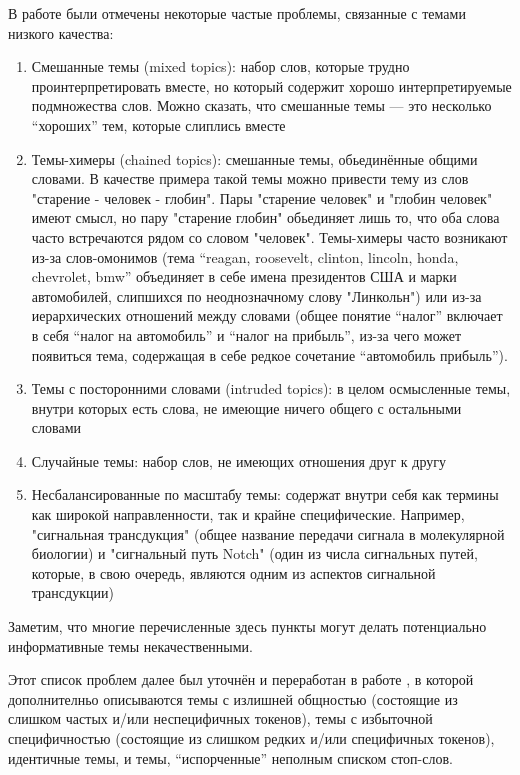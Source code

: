 В работе \cite{mimno} были отмечены некоторые частые проблемы, связанные с темами низкого качества:

\begin{enumerate}
\item{Смешанные темы (mixed topics): набор слов, которые трудно проинтерпретировать вместе, но который содержит хорошо интерпретируемые подмножества слов. Можно сказать, что смешанные темы --- это несколько ``хороших'' тем, которые слиплись вместе}
\item{Темы-химеры (chained topics): смешанные темы, обьединённые общими словами. В качестве примера такой темы можно привести тему из слов "старение - человек - глобин". Пары "старение человек" и "глобин человек" имеют смысл, но пару "старение глобин" обьединяет лишь то, что оба слова часто встречаются рядом со словом "человек". Темы-химеры часто возникают из-за слов-омонимов (тема ``reagan, roosevelt, clinton, lincoln, honda, chevrolet, bmw'' объединяет в себе имена президентов США и марки автомобилей, слипшихся по неоднозначному слову "Линкольн") или из-за иерархических отношений между словами (общее понятие ``налог'' включает в себя ``налог на автомобиль'' и ``налог на прибыль'', из-за чего может появиться тема, содержащая в себе редкое сочетание ``автомобиль прибыль'').}
\item{Темы с посторонними словами (intruded topics): в целом осмысленные темы, внутри которых есть слова, не имеющие ничего общего с остальными словами}
\item{Случайные темы: набор слов, не имеющих отношения друг к другу}
\item{Несбалансированные по масштабу темы: содержат внутри себя как термины как широкой направленности, так и крайне специфические. Например, "сигнальная трансдукция" (общее название передачи сигнала в молекулярной биологии) и "сигнальный путь Notch" (один из числа сигнальных путей, которые, в свою очередь, являются одним из аспектов сигнальной трансдукции)}
\end{enumerate}

Заметим, что многие перечисленные здесь пункты могут делать потенциально информативные темы некачественными.

Этот список проблем далее был уточнён и переработан в работе \cite{boydcare}, в которой дополнителньо описываются темы с излишней общностью (состоящие из слишком частых и/или неспецифичных токенов), темы с избыточной специфичностью (состоящие из слишком редких и/или специфичных токенов), идентичные темы, и темы, ``испорченные'' неполным списком стоп-слов.


